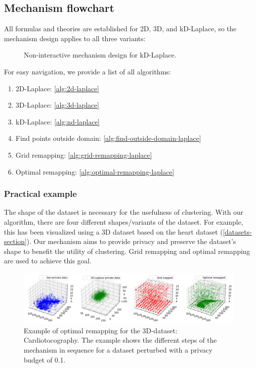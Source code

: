 \subsection{Mechanism flowchart}
All formulas and theories are established for 2D, 3D, and kD-Laplace, so the mechanism design applies to all three variants:
\begin{figure}[H]
    
    \caption{Non-interactive mechanism design for kD-Laplace.}
    \label{fig:final-mechanism-design}
\end{figure}

For easy navigation, we provide a list of all algorithms:
\begin{enumerate}
    \item 2D-Laplace:  \ref{alg:2d-laplace}
    \item 3D-Laplace: \ref{alg:3d-laplace}
    \item kD-Laplace: \ref{alg:nd-laplace}
    \item Find points outside domain: \ref{alg:find-outside-domain-laplace}
    \item Grid remapping: \ref{alg:grid-remapping-laplace}
    \item Optimal remapping: \ref{alg:optimal-remapping-laplace}
\end{enumerate}
\subsubsection{Practical example}
The shape of the dataset is necessary for the usefulness of clustering.
With our algorithm, there are four different shapes/variants of the dataset.
For example, this has been visualized using a 3D dataset based on the heart dataset (\ref{datasets-section}).
Our mechanism aims to provide privacy and preserve the dataset's shape to benefit the utility of clustering.
Grid remapping and optimal remapping are used to achieve this goal.

\begin{figure}[H]
    \includegraphics[width=1.1\textwidth]{TheorethicalFramework/ND-Laplace/Images/optimal-remapping-example.png}
    \caption{Example of optimal remapping for the 3D-dataset: Cardiotocography. The example shows the different steps of the mechanism in sequence for a dataset perturbed with a privacy budget of 0.1.}
\end{figure}

